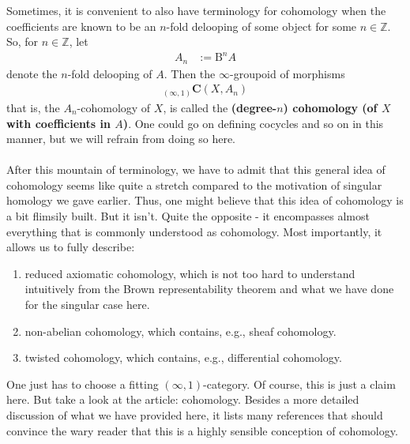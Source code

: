 Sometimes, it is convenient to also have terminology for cohomology when the coefficients are known to be an $n$-fold delooping of some object for some $n \in \mathbb{Z}$.
So, for $n \in \mathbb{Z}$, let
\begin{align*}
  A_{n}
  &:=
  \mathrm{B}^{n}A
\end{align*}
denote the $n$-fold delooping of $A$.
Then the $\infty$-groupoid of morphisms
\begin{align*}
  {}_{(\infty,1)}\mathbf{C}
  \left(
    X,
    A_{n}
  \right)
\end{align*}
that is, the $A_{n}$-cohomology of $X$, is called the \textbf{(degree-$n$) cohomology (of $X$ with coefficients in $A$)}.
One could go on defining cocycles and so on in this manner, but we will refrain from doing so here.
\\\\
After this mountain of terminology, we have to admit that this general idea of cohomology seems like quite a stretch compared to the motivation of singular homology we gave earlier.
Thus, one might believe that this idea of cohomology is a bit flimsily built.
But it isn't.
Quite the opposite - it encompasses almost everything that is commonly understood as cohomology.
Most importantly, it allows us to fully describe:
\begin{enumerate}
\item[(1)]
reduced axiomatic cohomology, which is not too hard to understand intuitively from the Brown representability theorem and what we have done for the singular case here.
\item[(2)]
non-abelian cohomology, which contains, e.g., sheaf cohomology.
\item[(3)]
twisted cohomology, which contains, e.g., differential cohomology.
\end{enumerate}
One just has to choose a fitting $(\infty,1)$-category.
Of course, this is just a claim here.
But take a look at the \cite{wiki-nlab0000} article: cohomology.
Besides a more detailed discussion of what we have provided here, it lists many references that should convince the wary reader that this is a highly sensible conception of cohomology.
